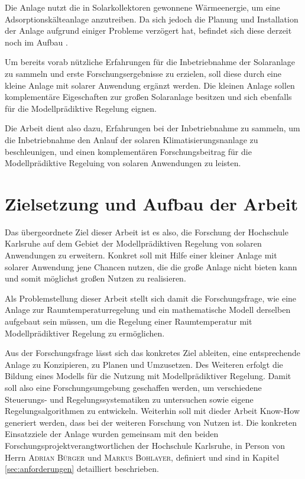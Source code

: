 Die Anlage nutzt die in Solarkollektoren gewonnene Wärmeenergie, um eine Adsorptionskälteanlage anzutreiben. Da sich jedoch die Planung und Installation der Anlage aufgrund einiger Probleme verzögert hat, befindet sich diese derzeit noch im Aufbau \cite{hska}.

Um bereits vorab nützliche Erfahrungen für die Inbetriebnahme der Solaranlage zu sammeln und erste Forschungsergebnisse  zu erzielen, soll diese durch eine kleine Anlage mit solarer Anwendung ergänzt werden. Die kleinen Anlage sollen komplementäre Eigeschaften zur großen Solaranlage besitzen und sich ebenfalls für die Modellprädiktive Regelung eignen.

Die Arbeit dient also dazu, Erfahrungen bei der Inbetriebnahme zu sammeln, um die Inbetriebnahme den Anlauf der solaren Klimatisierungsnanlage zu beschleunigen, und einen komplementären Forschungsbeitrag für die Modellprädiktive Regeluing von solaren Anwendungen zu leisten. 

\section{Zielsetzung und Aufbau der Arbeit}
\label{sec:ziel}

Das übergeordnete Ziel dieser Arbeit ist es also, die Forschung der Hochschule Karlsruhe auf dem Gebiet der Modellprädiktiven Regelung von solaren Anwendungen zu erweitern.
Konkret soll mit Hilfe einer kleiner Anlage mit solarer Anwendung jene Chancen nutzen, die die große Anlage nicht bieten kann und somit möglichst großen Nutzen zu realisieren. 

Als Problemstellung dieser Arbeit stellt sich damit die Forschungsfrage, wie eine Anlage zur Raumtemperaturregelung und ein mathematische Modell derselben aufgebaut sein müssen, um die Regelung einer Raumtemperatur mit Modellprädiktiver Regelung zu ermöglichen.


Aus der Forschungsfrage lässt sich das konkretes Ziel ableiten, eine entsprechende Anlage zu Konzipieren, zu Planen und Umzusetzen. Des Weiteren erfolgt die Bildung eines Modells für die Nutzung mit Modellprädiktiver Regelung.
Damit soll also eine Forschungsumgebung geschaffen werden, um verschiedene Steuerungs- und Regelungssystematiken zu untersuchen sowie eigene Regelungsalgorithmen zu entwickeln. Weiterhin soll mit dieder Arbeit Know-How generiert werden, dass bei der weiteren Forschung von Nutzen ist. Die konkreten Einsatzziele der Anlage wurden gemeinsam mit den beiden Forschungsprojektverangtwortlichen der Hochschule Karlsruhe, in Person von Herrn \textsc{Adrian Bürger} und \textsc{Markus Bohlayer}, definiert und sind in Kapitel \ref{sec:anforderungen} detailliert beschrieben.


